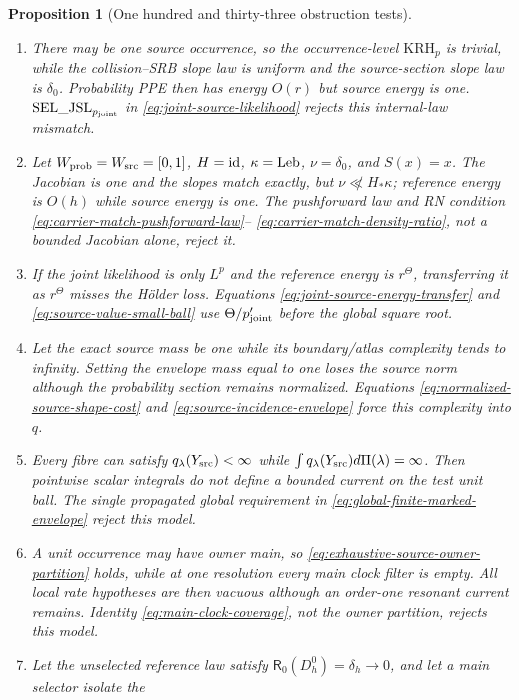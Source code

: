 \documentclass[11pt]{article}
\newtheorem{proposition}[theorem]{Proposition}
\begin{document}
\begin{proposition}[One hundred and thirty-three obstruction tests]
\begin{enumerate}[label=\textup{(T\arabic*)}]
\item There may be one source occurrence, so the occurrence-level
      $\mathrm{KRH}_p$ is trivial, while the collision--SRB slope law is
      uniform and the source-section slope law is $\delta_0$.  Probability
      PPE then has energy $O(r)$ but source energy is one.
      $\mathrm{SEL\_JSL}_{p_{\rm joint}}$ in
      \eqref{eq:joint-source-likelihood} rejects this internal-law mismatch.
\item Let $W_{\rm prob}=W_{\rm src}=[0,1]$, $H={\rm id}$,
      $\kappa={\rm Leb}$, $\nu=\delta_0$, and $S(x)=x$.  The Jacobian is one
      and the slopes match exactly, but
      $\nu\not\ll H_*\kappa$; reference energy is $O(h)$ while source energy
      is one.  The pushforward law and RN condition
      \eqref{eq:carrier-match-pushforward-law}--
      \eqref{eq:carrier-match-density-ratio}, not a bounded Jacobian alone,
      reject it.
\item If the joint likelihood is only $L^p$ and the reference energy is
      $r^\Theta$, transferring it as $r^\Theta$ misses the H\"older loss.
      Equations \eqref{eq:joint-source-energy-transfer} and
      \eqref{eq:source-value-small-ball} use
      $\Theta/p_{\rm joint}'$ before the global square root.
\item Let the exact source mass be one while its boundary/atlas complexity
      tends to infinity.  Setting the envelope mass equal to one loses the
      source norm although the probability section remains normalized.
      Equations \eqref{eq:normalized-source-shape-cost} and
      \eqref{eq:source-incidence-envelope} force this complexity into $q$.
\item Every fibre can satisfy $q_\lambda(Y_{\rm src})<\infty$ while
      $\int q_\lambda(Y_{\rm src})d\Pi(\lambda)=\infty$.  Then pointwise
      scalar integrals do not define a bounded current on the test unit ball.
      The single propagated global requirement in
      \eqref{eq:global-finite-marked-envelope} reject this model.
\item A unit occurrence may have owner main, so
      \eqref{eq:exhaustive-source-owner-partition} holds, while at one
      resolution every main clock filter is empty.  All local rate hypotheses
      are then vacuous although an order-one resonant current remains.
      Identity \eqref{eq:main-clock-coverage}, not the owner partition,
      rejects this model.
\item Let the unselected reference law satisfy
      $\mathsf R_0(D_h^0)=\delta_h\to0$, and let a main selector isolate the

\end{enumerate}
\end{proposition}
\end{document}

